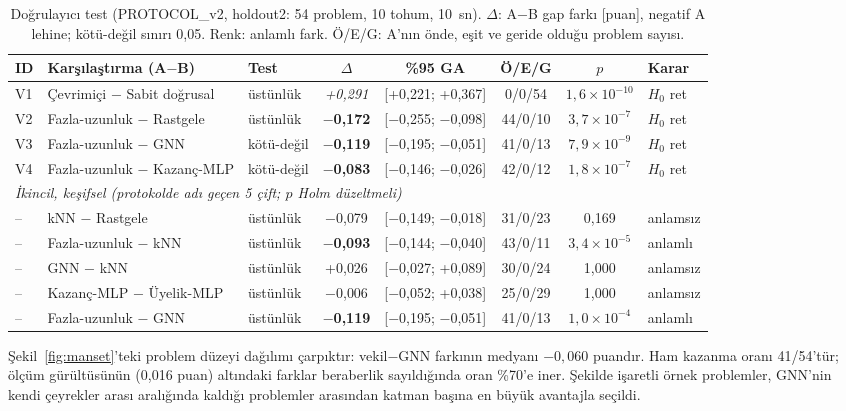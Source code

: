 \documentclass[pdflatex,sn-basic]{sn-jnl}
\newcommand{\iyi}[1]{\textcolor{iyiRenk}{\textbf{#1}}}
\newcommand{\kotu}[1]{\textcolor{kotuRenk}{\textit{#1}}}
\begin{document}
\begin{table}[!htbp]
\centering\small\setlength{\tabcolsep}{3pt}
\caption{Doğrulayıcı test (PROTOCOL\_v2, holdout2: 54 problem, 10 tohum, 10~sn). $\Delta$: A$-$B gap farkı [puan], negatif A lehine; kötü-değil sınırı 0{,}05. Renk: anlamlı fark. Ö/E/G: A'nın önde, eşit ve geride olduğu problem sayısı.}
\label{tab:v3-confirm}
\begin{tabularx}{\textwidth}{@{}l>{\raggedright\arraybackslash}Xlccccl@{}}
\toprule
ID & Karşılaştırma (A$-$B) & Test & $\Delta$ & \%95 GA & Ö/E/G & $p$ & Karar \\
\midrule
V1 & Çevrimiçi $-$ Sabit doğrusal & üstünlük & \kotu{+0{,}291} & [+0{,}221; +0{,}367] & 0/0/54 & $1{,}6\times10^{-10}$ & $H_0$ ret \\
V2 & Fazla-uzunluk $-$ Rastgele & üstünlük & \iyi{$-$0{,}172} & [$-$0{,}255; $-$0{,}098] & 44/0/10 & $3{,}7\times10^{-7}$ & $H_0$ ret \\
V3 & Fazla-uzunluk $-$ GNN & kötü-değil & \iyi{$-$0{,}119} & [$-$0{,}195; $-$0{,}051] & 41/0/13 & $7{,}9\times10^{-9}$ & $H_0$ ret \\
V4 & Fazla-uzunluk $-$ Kazanç-MLP & kötü-değil & \iyi{$-$0{,}083} & [$-$0{,}146; $-$0{,}026] & 42/0/12 & $1{,}8\times10^{-7}$ & $H_0$ ret \\
\midrule
\multicolumn{8}{l}{\textit{İkincil, keşifsel (protokolde adı geçen 5 çift; $p$ Holm düzeltmeli)}} \\
-- & kNN $-$ Rastgele & üstünlük & $-$0{,}079 & [$-$0{,}149; $-$0{,}018] & 31/0/23 & 0{,}169 & anlamsız \\
-- & Fazla-uzunluk $-$ kNN & üstünlük & \iyi{$-$0{,}093} & [$-$0{,}144; $-$0{,}040] & 43/0/11 & $3{,}4\times10^{-5}$ & anlamlı \\
-- & GNN $-$ kNN & üstünlük & +0{,}026 & [$-$0{,}027; +0{,}089] & 30/0/24 & 1{,}000 & anlamsız \\
-- & Kazanç-MLP $-$ Üyelik-MLP & üstünlük & $-$0{,}006 & [$-$0{,}052; +0{,}038] & 25/0/29 & 1{,}000 & anlamsız \\
-- & Fazla-uzunluk $-$ GNN & üstünlük & \iyi{$-$0{,}119} & [$-$0{,}195; $-$0{,}051] & 41/0/13 & $1{,}0\times10^{-4}$ & anlamlı \\
\bottomrule
\end{tabularx}
\end{table}

Şekil~\ref{fig:manset}'teki problem düzeyi dağılımı çarpıktır: vekil$-$GNN farkının medyanı
$-0{,}060$ puandır. Ham kazanma oranı 41/54'tür; ölçüm gürültüsünün (0,016 puan) altındaki farklar
beraberlik sayıldığında oran \%70'e iner. Şekilde işaretli örnek problemler, GNN'nin kendi
çeyrekler arası aralığında kaldığı problemler arasından katman başına en büyük avantajla seçildi.
\end{document}
